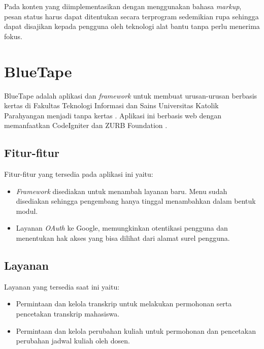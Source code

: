 Pada konten yang diimplementasikan dengan menggunakan bahasa \textit{markup}, pesan status harus dapat ditentukan secara terprogram sedemikian rupa sehingga dapat disajikan kepada pengguna oleh teknologi alat bantu tanpa perlu menerima fokus.



\section{BlueTape}
\label{sec:bluetape}
BlueTape adalah aplikasi dan \textit{framework} untuk membuat urusan-urusan berbasis kertas di Fakultas Teknologi Informasi dan Sains Universitas Katolik Parahyangan menjadi tanpa kertas \cite{BlueTape}. Aplikasi ini berbasis web dengan memanfaatkan CodeIgniter \cite{CodeIgniter} dan ZURB Foundation \cite{Foundation}.

\subsection{Fitur-fitur}
\label{sec:bluetape_fitur}
Fitur-fitur yang tersedia pada aplikasi ini yaitu:
\begin{itemize}
	\item \textit{Framework} disediakan untuk menambah layanan baru. Menu sudah disediakan sehingga pengembang hanya tinggal menambahkan dalam bentuk modul.
	\item Layanan \textit{OAuth} ke Google, memungkinkan otentikasi pengguna dan menentukan hak akses yang bisa dilihat dari alamat surel pengguna.
\end{itemize}

\subsection{Layanan}
\label{sec:bluetape_layanan}
Layanan yang tersedia saat ini yaitu:
\begin{itemize}
	\item Permintaan dan kelola transkrip untuk melakukan permohonan serta pencetakan transkrip mahasiswa.
	\item Permintaan dan kelola perubahan kuliah untuk permohonan dan pencetakan perubahan jadwal kuliah oleh dosen.
\end{itemize}

